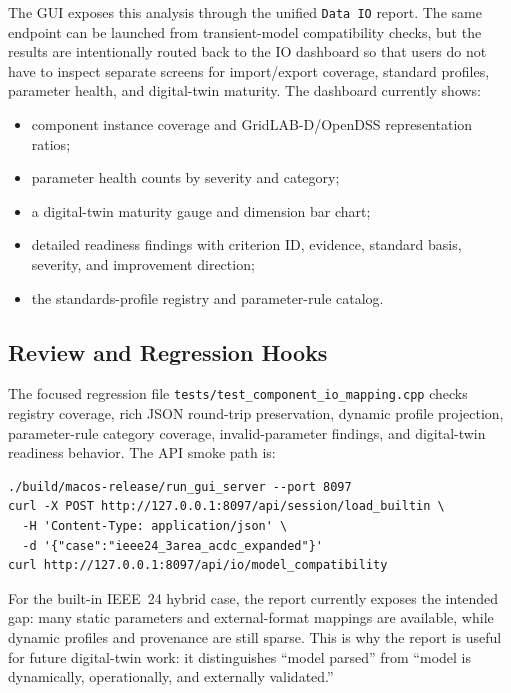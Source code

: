 The GUI exposes this analysis through the unified \texttt{Data IO} report.  The
same endpoint can be launched from transient-model compatibility checks, but
the results are intentionally routed back to the IO dashboard so that users do
not have to inspect separate screens for import/export coverage, standard
profiles, parameter health, and digital-twin maturity.  The dashboard currently
shows:
\begin{itemize}
  \item component instance coverage and GridLAB-D/OpenDSS representation ratios;
  \item parameter health counts by severity and category;
  \item a digital-twin maturity gauge and dimension bar chart;
  \item detailed readiness findings with criterion ID, evidence, standard
        basis, severity, and improvement direction;
  \item the standards-profile registry and parameter-rule catalog.
\end{itemize}

\subsection{Review and Regression Hooks}

The focused regression file \texttt{tests/test\_component\_io\_mapping.cpp}
checks registry coverage, rich JSON round-trip preservation, dynamic profile
projection, parameter-rule category coverage, invalid-parameter findings, and
digital-twin readiness behavior.  The API smoke path is:
\begin{verbatim}
./build/macos-release/run_gui_server --port 8097
curl -X POST http://127.0.0.1:8097/api/session/load_builtin \
  -H 'Content-Type: application/json' \
  -d '{"case":"ieee24_3area_acdc_expanded"}'
curl http://127.0.0.1:8097/api/io/model_compatibility
\end{verbatim}

For the built-in IEEE~24 hybrid case, the report currently exposes the intended
gap: many static parameters and external-format mappings are available, while
dynamic profiles and provenance are still sparse.  This is why the report is
useful for future digital-twin work: it distinguishes ``model parsed'' from
``model is dynamically, operationally, and externally validated.''
